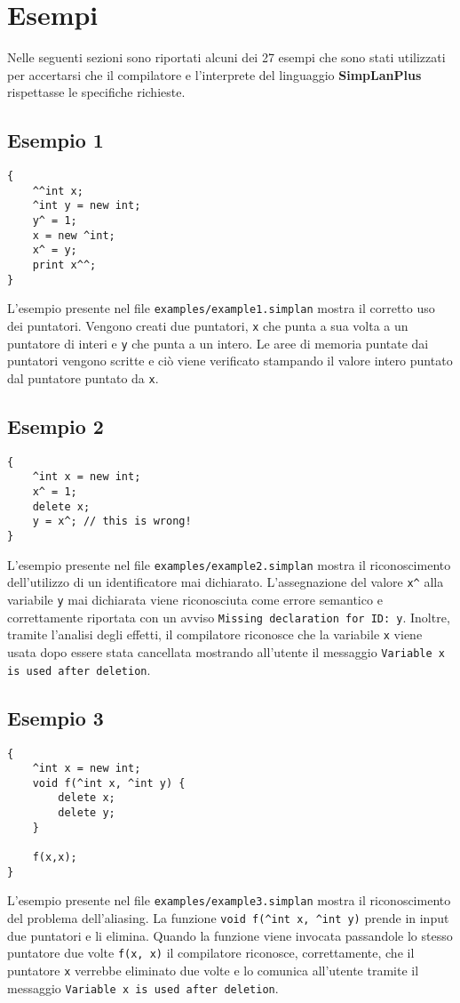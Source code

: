 \documentclass[../report.tex]{subfiles}
\begin{document}
\chapter{Esempi}\label{c:esempi}
Nelle seguenti sezioni sono riportati alcuni dei 27 esempi che sono stati utilizzati per accertarsi che il compilatore e l'interprete del linguaggio \textbf{SimpLanPlus} rispettasse le specifiche richieste.
\section{Esempio 1}
\begin{lstlisting}
{
    ^^int x;
    ^int y = new int;
    y^ = 1;
    x = new ^int;
    x^ = y;
    print x^^;
}
\end{lstlisting}
L'esempio presente nel file \verb|examples/example1.simplan| mostra il corretto uso dei puntatori.
Vengono creati due puntatori, \verb|x| che punta a sua volta a un puntatore di interi e \verb|y| che punta a un intero.
Le aree di memoria puntate dai puntatori vengono scritte e ciò viene verificato stampando il valore intero puntato dal puntatore puntato da \verb|x|.

\section{Esempio 2}
\begin{lstlisting}
{
    ^int x = new int;
    x^ = 1;
    delete x;
    y = x^; // this is wrong!
}
\end{lstlisting}
L'esempio presente nel file \verb|examples/example2.simplan| mostra il riconoscimento dell'utilizzo di un identificatore mai dichiarato.
L'assegnazione del valore \verb|x^| alla variabile \verb|y| mai dichiarata viene riconosciuta come errore semantico e correttamente riportata con un avviso \verb|Missing declaration for ID: y|.
Inoltre, tramite l'analisi degli effetti, il compilatore riconosce che la variabile \verb|x| viene usata dopo essere stata cancellata mostrando all'utente il messaggio \verb|Variable x is used after deletion|.

\section{Esempio 3}
\begin{lstlisting}
{
    ^int x = new int;
    void f(^int x, ^int y) {
        delete x;
        delete y;
    }

    f(x,x);
}
\end{lstlisting}
L'esempio presente nel file \verb|examples/example3.simplan| mostra il riconoscimento del problema dell'aliasing. La funzione \verb|void f(^int x, ^int y)| prende in input due puntatori e li elimina. Quando la funzione viene invocata passandole lo stesso puntatore due volte \verb|f(x, x)| il compilatore riconosce, correttamente, che il puntatore \verb|x| verrebbe eliminato due volte e lo comunica all'utente tramite il messaggio \verb|Variable x is used after deletion|.
\end{document}
